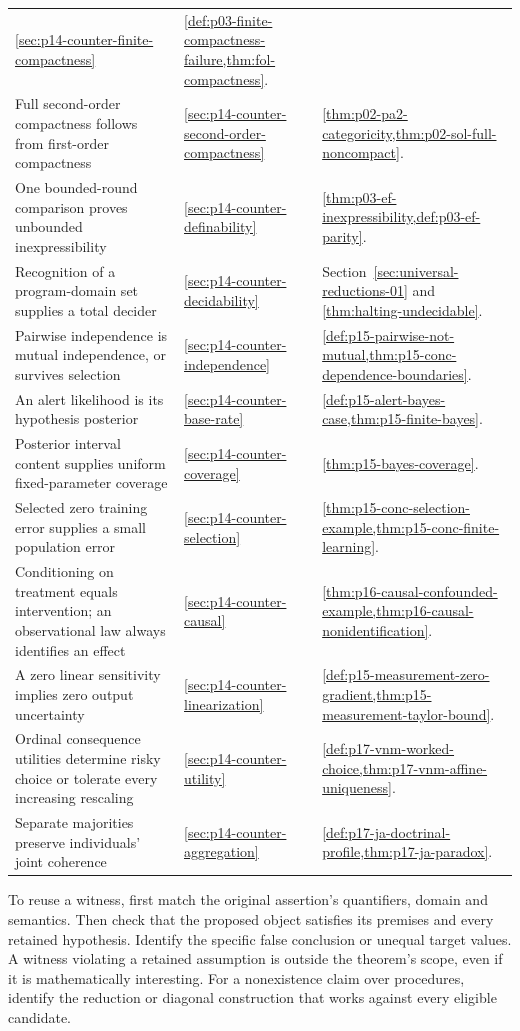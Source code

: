 \begin{longtable}{@{}p{}p{}p{}@{}}
\cref{sec:p14-counter-finite-compactness} &
\cref{def:p03-finite-compactness-failure,thm:fol-compactness}. \\
Full second-order compactness follows from first-order compactness &
\cref{sec:p14-counter-second-order-compactness} &
\cref{thm:p02-pa2-categoricity,thm:p02-sol-full-noncompact}. \\
One bounded-round comparison proves unbounded inexpressibility &
\cref{sec:p14-counter-definability} &
\cref{thm:p03-ef-inexpressibility,def:p03-ef-parity}. \\
Recognition of a program-domain set supplies a total decider &
\cref{sec:p14-counter-decidability} &
Section~\ref{sec:universal-reductions-01} and
\cref{thm:halting-undecidable}. \\
Pairwise independence is mutual independence, or survives selection &
\cref{sec:p14-counter-independence} &
\cref{def:p15-pairwise-not-mutual,thm:p15-conc-dependence-boundaries}. \\
An alert likelihood is its hypothesis posterior &
\cref{sec:p14-counter-base-rate} &
\cref{def:p15-alert-bayes-case,thm:p15-finite-bayes}. \\
Posterior interval content supplies uniform fixed-parameter coverage &
\cref{sec:p14-counter-coverage} & \cref{thm:p15-bayes-coverage}. \\
Selected zero training error supplies a small population error &
\cref{sec:p14-counter-selection} &
\cref{thm:p15-conc-selection-example,thm:p15-conc-finite-learning}. \\
Conditioning on treatment equals intervention; an observational law always identifies an effect &
\cref{sec:p14-counter-causal} &
\cref{thm:p16-causal-confounded-example,thm:p16-causal-nonidentification}. \\
A zero linear sensitivity implies zero output uncertainty &
\cref{sec:p14-counter-linearization} &
\cref{def:p15-measurement-zero-gradient,thm:p15-measurement-taylor-bound}. \\
Ordinal consequence utilities determine risky choice or tolerate every increasing rescaling &
\cref{sec:p14-counter-utility} &
\cref{def:p17-vnm-worked-choice,thm:p17-vnm-affine-uniqueness}. \\
Separate majorities preserve individuals' joint coherence &
\cref{sec:p14-counter-aggregation} &
\cref{def:p17-ja-doctrinal-profile,thm:p17-ja-paradox}. \\
\bottomrule
\end{longtable}

To reuse a witness, first match the original assertion's quantifiers, domain
and semantics. Then check that the proposed object satisfies its premises
and every retained hypothesis. Identify the specific false conclusion or
unequal target values. A witness violating a retained assumption is outside
the theorem's scope, even if it is mathematically interesting. For a
nonexistence claim over procedures, identify the reduction or diagonal
construction that works against every eligible candidate.

